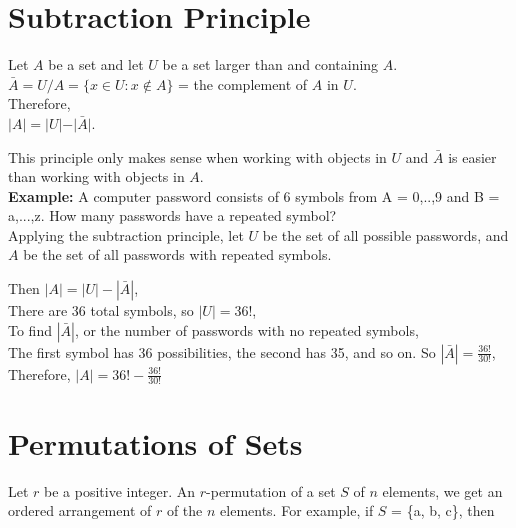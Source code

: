 \documentclass[12pt, letterpaper]{article}
\begin{document}
\pagebreak
\section*{Subtraction Principle}
\begin{center}
  Let \(A\) be a set and let \(U\) be a set larger than and containing \(A\).
  \(\bar{A} = U / A = \{x \in U : x \notin A\}\) = the complement of \(A\) in \(U\). \\
  Therefore,\\
   \(\vert A \vert = \vert U \vert - \vert \bar{A} \vert\).
\end{center}
This principle only makes sense when working with objects in \(U\) and \(\bar{A}\) is easier than working with objects in \(A\). \\ 

\textbf{Example:} A computer password consists of 6 symbols from A = {0,..,9} and B = {a,...,z}. How many passwords have a repeated symbol? \\

\noindent Applying the subtraction principle, let \(U\) be the set of all possible passwords, and \(A\) be the set of all passwords with repeated symbols. \\

\begin{center}
  Then \(|A| = |U| - |\bar{A}|\), \\
  There are 36 total symbols, so \(|U| = 36!\), \\
  To find \(|\bar{A}|\), or the number of passwords with no repeated symbols, \\
  The first symbol has 36 possibilities, the second has 35, and so on. So \(|\bar{A}| = \frac{36!}{30!}\), \\
  Therefore, \(|A| = 36! - \frac{36!}{30!}\) \\
\end{center}

\pagebreak
\section*{Permutations of Sets}
Let \(r\) be a positive integer. An \(r\)-permutation of a set \(S\) of \(n\) elements, we get an ordered arrangement of \(r\) of the \(n\) elements. For example, if \(S\) = \{a, b, c\}, then 
\end{document}
